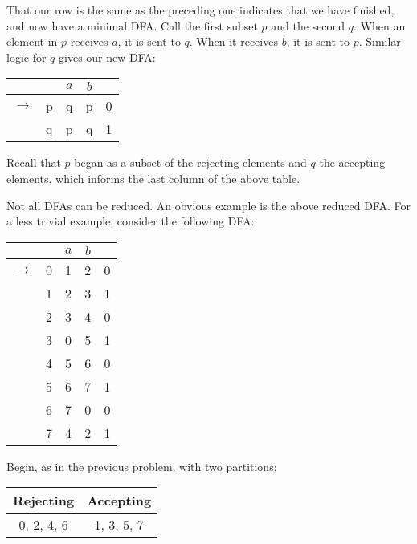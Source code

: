 That our row is the same as the preceding one indicates that we have finished, and now have a minimal DFA. Call the first subset $p$ and the second $q$. When an element in $p$ receives $a$, it is sent to $q$. When it receives $b$, it is sent to $p$. Similar logic for $q$ gives our new DFA:

\begin{center}\begin{tabular}{c c| c c r}
         & & $a$ & $b$ & \\\hline
         $\to$ & p & q & p & 0\\
               & q & p & q & 1\\
    \end{tabular}\end{center}

Recall that $p$ began as a subset of the rejecting elements and $q$ the accepting elements, which informs the last column of the above table.
    
Not all DFAs can be reduced. An obvious example is the above reduced DFA. For a less trivial example, consider the following DFA:
   
    \begin{center}\begin{tabular}{c c| c c r}
         & & $a$ & $b$ & \\\hline
         $\to$ & 0 & 1 & 2 & 0\\
               & 1 & 2 & 3 & 1\\
               & 2 & 3 & 4 & 0\\
               & 3 & 0 & 5 & 1\\
               & 4 & 5 & 6 & 0\\
               & 5 & 6 & 7 & 1\\
               & 6 & 7 & 0 & 0\\
               & 7 & 4 & 2 & 1
    \end{tabular}\end{center}

Begin, as in the previous problem, with two partitions:

\begin{center}\begin{tabular}{c|c|c|c|c|c|c|c}
\multicolumn{4}{c|}{Rejecting} & \multicolumn{4}{|c}{Accepting}\\\hline
\multicolumn{4}{c|}{0, 2, 4, 6} & \multicolumn{4}{|c}{1, 3, 5, 7}
\end{tabular}\end{center}

